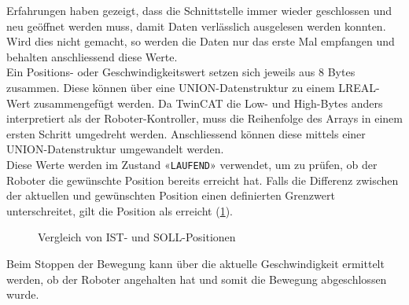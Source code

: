 		Erfahrungen haben gezeigt, dass die Schnittstelle immer wieder geschlossen und neu geöffnet werden muss, damit Daten verlässlich ausgelesen werden konnten. Wird dies nicht gemacht, so werden die Daten nur das erste Mal empfangen und behalten anschliessend diese Werte.
		\\
		Ein Positions- oder Geschwindigkeitswert setzen sich jeweils aus 8 Bytes zusammen. Diese können über eine UNION-Datenstruktur zu einem LREAL-Wert zusammengefügt werden. Da TwinCAT die Low- und High-Bytes anders interpretiert als der Roboter-Kontroller, muss die Reihenfolge des Arrays in einem ersten Schritt umgedreht werden. Anschliessend können diese mittels einer UNION-Datenstruktur umgewandelt werden. 
		\\
		Diese Werte werden im Zustand «\verb|LAUFEND|» verwendet, um zu prüfen, ob der Roboter die gewünschte Position bereits erreicht hat. Falls die Differenz zwischen der aktuellen und gewünschten Position einen definierten Grenzwert unterschreitet, gilt die Position als erreicht (\ref{fig:Positionsvergleich}).
		
		\newpage
		
		\begin{figure}[h!]
			\centering
			\captionsetup{justification=centering}
			\caption{Vergleich von IST- und SOLL-Positionen}
			\label{fig:Positionsvergleich}
		\end{figure}
		
		Beim Stoppen der Bewegung kann über die aktuelle Geschwindigkeit ermittelt werden, ob der Roboter angehalten hat und somit die Bewegung abgeschlossen wurde.
		\vspace{3mm}
		

